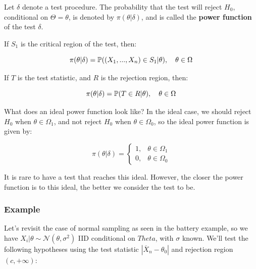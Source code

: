 \documentclass[a4paper]{article}
\begin{document}
            \begin{definition}
                Let $\delta$ denote a test procedure. The probability that the
                test will reject $H_0$, conditional on $\Theta = \theta$, is
                denoted by $\pi(\theta | \delta)$, and is called the
                \textbf{power function} of the test $\delta$.

                If $S_1$ is the critical region of the test, then:

                \[
                    \pi(\theta | \delta) = \mathbb{P}((X_1, ..., X_n) \in S_1 |
                    \theta), \quad \theta \in \Omega
                \]

                If $T$ is the test statistic, and $R$ is the rejection region,
                then:

                \[
                    \pi(\theta | \delta) = \mathbb{P}(T \in R | \theta), \quad
                    \theta \in \Omega
                \]
            \end{definition}

            What does an ideal power function look like? In the ideal case, we
            should reject $H_0$ when $\theta \in \Omega_1$, and not reject
            $H_0$ when $\theta \in \Omega_0$, so the ideal power function is
            given by:

            \[
                \pi(\theta | \delta) = \begin{cases}
                    1, & \theta \in \Omega_1 \\
                    0, & \theta \in \Omega_0
                \end{cases}
            \]

            It is rare to have a test that reaches this ideal. However, the
            closer the power function is to this ideal, the better we consider
            the test to be.

            \subsubsection{Example}
                Let's revisit the case of normal sampling as seen in the battery
                example, so we have $X_i | \theta \sim \mathcal{N}(\theta,
                \sigma^2)$ IID conditional on $Theta$, with $\sigma$ known.
                We'll test the following hypotheses using the test statistic
                $|\overline X_n - \theta_0|$ and rejection region $(c,
                +\infty)$:
\end{document}
